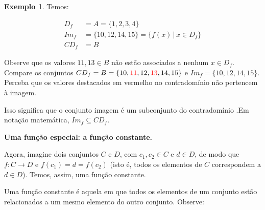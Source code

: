 \documentclass[12pt,openright,twoside,a4paper]{article}
\theoremstyle{definition}
\newtheorem{example}{Exemplo}[section]
\begin{document}
\begin{example}
		Temos:
		
		\begin{align*}
			D_f &= A = \{1,2,3,4\}\\
			Im_f &= \{10, 12, 14, 15\} = \{f(x) \,|\, x \in D_f\} \\
			CD_f &= B			
		\end{align*}
		
		Observe que os valores $11, 13 \in B$ não estão associados a nenhum $x \in D_f$. Compare os conjuntos $CD_f = B = \{10, \textcolor{red}{11}, 12, \textcolor{red}{13}, 14, 15\}$ e $Im_f = \{10, 12, 14, 15\}$. Perceba que os valores destacados em vermelho no contradomínio não pertencem à imagem.
		
		Isso significa que o conjunto imagem é um subconjunto do contradomínio .Em notação matemática, $Im_f \subseteq CD_f$. 
	\end{example}
	
	\textbf{Uma função especial: a função constante.}
	
	Agora, imagine dois conjuntos $C$ e $D$, com $c_1, c_2 \in C$ e $d \in D$, de modo que $f: C \longrightarrow D$ e $f(c_1) = d = f(c_2)$ (isto é, todos os elementos de $C$ correspondem a $d \in D$). Temos, assim, uma função constante.
	
	Uma função constante é aquela em que todos os elementos de um conjunto estão relacionados a um mesmo elemento do outro conjunto. Observe:
	
\end{document}
